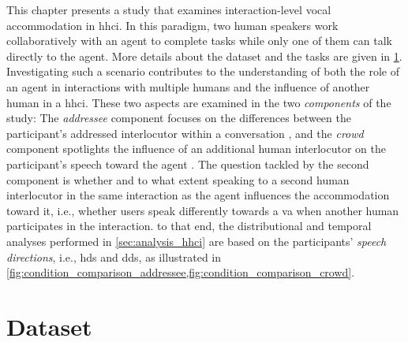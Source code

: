 This chapter presents a study that examines interaction-level vocal accommodation in \ac{hhci}.
In this paradigm, two human speakers work collaboratively with an agent to complete tasks while only one of them can talk directly to the agent.
More details about the dataset and the tasks are given in \cref{sec:vacc}.
Investigating such a scenario contributes to the understanding of both the role of an agent in interactions with multiple humans and the influence of another human in a \ac{hhci}.
These two aspects are examined in the two \emph{components} of the study:
The \emph{addressee} component focuses on the differences between the participant's addressed interlocutor within a conversation \citep[][see]{Raveh2019ESSV}, and the \emph{crowd} component spotlights the influence of an additional human interlocutor on the participant's speech toward the agent \citep[see][]{Raveh2019InterspeechAlexa}.
The question tackled by the second component is whether and to what extent speaking to a second human interlocutor in the same interaction as the agent influences the accommodation toward it, i.e., whether users speak differently towards a \ac{va} when another human participates in the interaction.
to that end, the distributional and temporal analyses performed in \cref{sec:analysis_hhci} are based on the participants' \emph{speech directions}, i.e., \acf{hds} and \acf{dds}, as illustrated in \cref{fig:condition_comparison_addressee,fig:condition_comparison_crowd}.

\section[The \acl{vacc}]{Dataset}
\label{sec:vacc}


